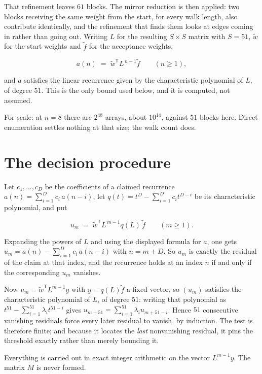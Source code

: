 \documentclass[11pt]{article}
\theoremstyle{definition}
\begin{document}
That refinement leaves $61$ blocks. The mirror reduction is then applied: two blocks receiving the same weight from the start, for every walk length, also contribute identically, and the refinement that finds them looks at edges coming in rather than going out. Writing $L$ for the resulting $S \times S$ matrix with $S = 51$, $\tilde w$ for the start weights and $\tilde f$ for the acceptance weights,

\[a(n) \;=\; \tilde w^{\mathsf T} L^{\,n-1} \tilde f \qquad (n \ge 1),\]

and $a$ satisfies the linear recurrence given by the characteristic polynomial of $L$, of degree $51$. This is the only bound used below, and it is computed, not assumed.

For scale: at $n = 8$ there are $2^{48}$ arrays, about $10^{14}$, against $51$ blocks here. Direct enumeration settles nothing at that size; the walk count does.

\section{The decision procedure}

Let $c_1,\dots,c_D$ be the coefficients of a claimed recurrence $a(n) = \sum_{i=1}^{D} c_i\,a(n-i)$, let $q(t) = t^{D} - \sum_{i=1}^{D} c_i t^{D-i}$ be its characteristic polynomial, and put

\[u_m \;=\; \tilde w^{\mathsf T} L^{\,m-1} q(L)\,\tilde f \qquad (m \ge 1).\]

Expanding the powers of $L$ and using the displayed formula for $a$, one gets $u_m = a(n) - \sum_{i=1}^{D} c_i\,a(n-i)$ with $n = m + D$. So $u_m$ is exactly the residual of the claim at that index, and the recurrence holds at an index $n$ if and only if the corresponding $u_m$ vanishes.

Now $u_m = \tilde w^{\mathsf T} L^{m-1} y$ with $y = q(L)\tilde f$ a fixed vector, so $(u_m)$ satisfies the characteristic polynomial of $L$, of degree $51$: writing that polynomial as $t^{51} - \sum_{i=1}^{51} \lambda_i t^{51-i}$ gives $u_{m+51} = \sum_{i=1}^{51} \lambda_i u_{m+51-i}$. Hence $51$ consecutive vanishing residuals force every later residual to vanish, by induction. The test is therefore finite; and because it locates the {\itshape last} nonvanishing residual, it pins the threshold exactly rather than merely bounding it.

Everything is carried out in exact integer arithmetic on the vector $L^{m-1}y$. The matrix $M$ is never formed.
\end{document}
